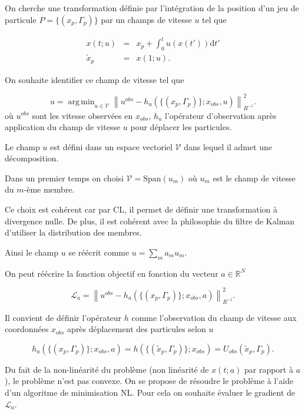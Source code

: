 \documentclass{article}
\DeclareMathOperator*{\argmin}{arg\,min}
\newcommand{\norm}[1]{\left\lVert #1 \right\rVert}
\begin{document}
On cherche une transformation définie par l'intégration de la position d'un jeu de particule $P = \{(x_p, \Gamma_p)\}$ par un champs de vitesse $u$ tel que

\begin{eqnarray*}
    x(t;u) &=& x_p + \int_{0}^{t} u(x(t')) \mathrm dt' \\
    \tilde x_p &=& x(1; u).
\end{eqnarray*}

On souhaite identifier ce champ de vitesse tel que

\begin{equation*}
    u = \argmin_{u \in \mathcal{V}} \norm{u^{obs} - h_u(\{(x_p, \Gamma_p)\}; x_{obs}, u)}^2_{R^{-1}}.
\end{equation*}où $u^{obs}$ sont les vitesse observées en $x_{obs}$, $h_u$ l'opérateur d'observation après application du champ de vitesse $u$ pour déplacer les particules.

Le champ $u$ est défini dans un espace vectoriel $\mathcal{V}$ dans lequel il admet une décomposition.

Dans un premier temps on choisi $\mathcal{V} = \text{Span}(u_m)$ où $u_m$ est le champ de vitesse du $m$-ème membre.

Ce choix est cohérent car par CL, il permet de définir une transformation à divergence nulle.
De plus, il est cohérent avec la philosophie du filtre de Kalman d'utiliser la distribution des membres.

Ainsi le champ $u$ se réécrit comme $u = \sum_m a_m u_m$.

On peut réécrire la fonction objectif en fonction du vecteur $a \in \mathbb{R}^N$

\begin{equation*}
    \mathcal L_a =  \norm{u^{obs} - h_a(\{(x_p, \Gamma_p)\}; x_{obs}, a)}^2_{R^{-1}}.
\end{equation*}

Il convient de définir l'opérateur $h$ comme l'observation du champ de vitesse aux coordonnées $x_{obs}$ après déplacement des particules selon $u$

\begin{equation*}
    h_a(\{(x_p, \Gamma_p)\}; x_{obs}, a) = h(\{(\tilde x_p, \Gamma_p)\}; x_{obs}) = U_{obs}(\tilde x_p, \Gamma_p).
\end{equation*}

Du fait de la non-linéarité du problème (non linéarité de $x(t;a)$ par rapport à $a$), le problème n'est pas convexe. On se propose de résoudre le problème à l'aide d'un algoritme de minimisation NL. Pour cela on souhaite évaluer le gradient de $\mathcal L_a$.
\end{document}
